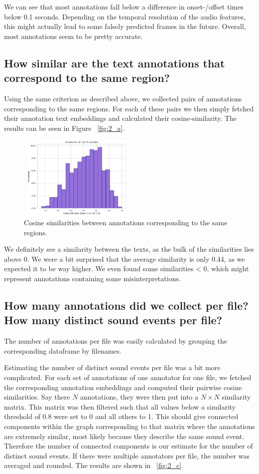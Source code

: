 We can see that most annotations fall below a difference in onset-/offset times below 0.1 seconds. Depending on the temporal resolution of the audio features, this might actually lead to some falsely predicted frames in the future. Overall, most annotations seem to be pretty accurate.


\subsection{How similar are the text annotations that correspond to the same region?}
\label{sec:Annotation Quality:b1}
Using the same criterion as described above, we collected pairs of annotations corresponding to the same regions. For each of these pairs we then simply fetched their annotation text embeddings and calculated their cosine-similarity. The results can be seen in Figure ~\ref{fig:2_a}.

\begin{figure}[htbp]
  \centering
  \includegraphics[width=0.5\textwidth, height=4cm]{figs/sim_diffs.png}
  \caption{Cosine similarities between annotations corresponding to the same regions.}
  \label{fig:2_b}
\end{figure}

We definitely see a similarity between the texts, as the bulk of the similarities lies above 0. We were a bit surprised that the average similarity is only 0.44, as we expected it to be way higher. We even found some similarities < 0, which might represent annotations containing some misinterpretations.

\subsection{How many annotations did we collect per file? How many distinct sound events per file?}
\label{sec:Annotation Quality:a2}
The number of annotations per file was easily calculated by grouping the corresponding dataframe by filenames.

Estimating the number of distinct sound events per file was a bit more complicated. For each set of annotations of one annotator for one file, we fetched the corresponding annotation embeddings and computed their pairwise cosine similarities. Say there $N$ annotations, they were then put into a $N \times N$ similarity matrix. This matrix was then filtered such that all values below a similarity threshold of 0.8 were set to 0 and all others to 1. This should give connected components within the graph corresponding to that matrix where the annotations are extremely similar, most likely because they describe the same sound event. Therefore the number of connected components is our estimate for the number of distinct sound events. If there were multiple annotators per file, the number was averaged and rounded. The results are shown in ~\ref{fig:2_c}.

